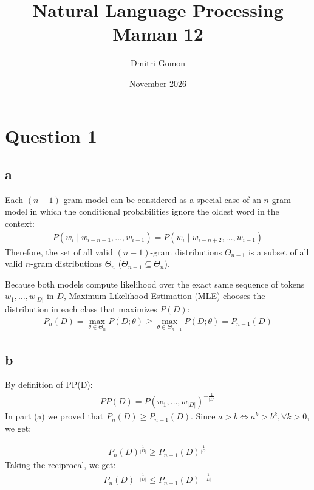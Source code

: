 \documentclass{article}
\title{Natural Language Processing \\ \large Maman 12}
\author{Dmitri Gomon}
\date{November 2026}
\numberwithin{equation}{section}
\begin{document}
    \maketitle

    \section*{Question 1}
    \subsection*{a}
    Each $(n - 1)$-gram model can be considered as a special case of an $n$-gram model in which the conditional probabilities ignore the oldest word in the context:
    \begin{align*}
        P(w_i \mid w_{i - n + 1}, \dots, w_{i - 1}) = P(w_i \mid w_{i - n + 2}, \dots, w_{i - 1})
    \end{align*}
    Therefore, the set of all valid $(n-1)$-gram distributions $\Theta_{n-1}$ is a subset of all valid $n$-gram distributions $\Theta_n$ ($\Theta_{n-1} \subseteq \Theta_n$).

    \noindent Because both models compute likelihood over the exact same sequence of tokens $w_1, \dots, w_{|D|}$ in $D$, Maximum Likelihood Estimation (MLE) chooses the distribution in each class that maximizes $P(D)$:
    \begin{align*}
        P_n(D) = \max_{\theta \in \Theta_n} P(D; \theta) \ge \max_{\theta \in \Theta_{n-1}} P(D; \theta) = P_{n-1}(D)
    \end{align*}

    \subsection*{b}
    By definition of PP(D):
    \begin{align*}
        PP(D) = P(w_1, \dots, w_{|D|})^{-\frac{1}{|D|}}
    \end{align*}
    In part (a) we proved that $P_n(D) \geq P_{n - 1}(D)$.
    Since $a > b \iff a^k > b^k, \forall k > 0$, we get:

    \begin{align*}
        P_n(D)^{\frac{1}{|D|}} \geq P_{n - 1}(D)^{\frac{1}{|D|}}
    \end{align*}
    Taking the reciprocal, we get:
    \begin{align*}
        P_n(D)^{-\frac{1}{|D|}} \leq P_{n - 1}(D)^{-\frac{1}{|D|}}
    \end{align*}
\end{document}
